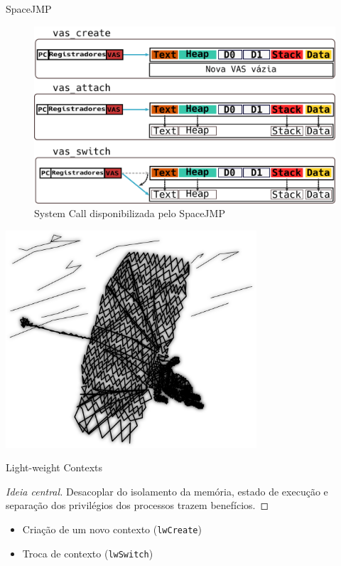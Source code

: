 \documentclass[xcolor={usenames,svgnames,dvipsnames},brazil,english,12pt,aspectratio=149]{beamer}
\begin{document}
\begin{frame}{SpaceJMP}
  \begin{figure}[!h]
    \centering
    \includegraphics[width=.7\textwidth]{mvas_example} 
    \caption*{System Call disponibilizada pelo SpaceJMP}
  \end{figure}
\end{frame}

\begin{frame}[plain]
  \includegraphics[width=0.7\textwidth]{presentation_cap2_eight}
\end{frame}

\begin{frame}{Light-weight Contexts}

  \begin{proof}[Ideia central]
Desacoplar do isolamento da memória, estado de execução e separação dos
privilégios dos processos trazem benefícios.
  \end{proof}

  \begin{itemize}
    \item Criação de um novo contexto (\texttt{lwCreate})
    \item Troca de contexto (\texttt{lwSwitch})
  \end{itemize}

\end{frame}
\end{document}
